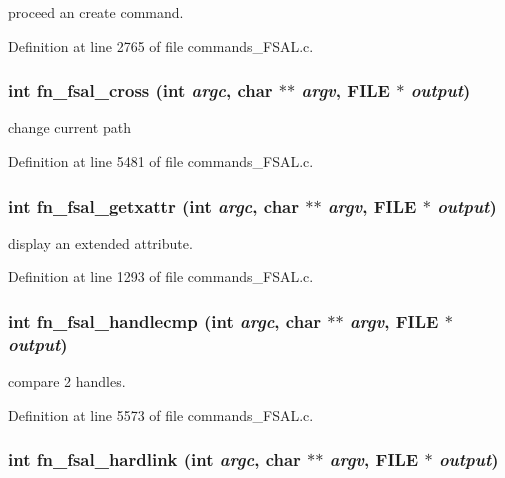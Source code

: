 proceed an create command. 

Definition at line 2765 of file commands\_\-FSAL.c.
\subsubsection[{fn\_\-fsal\_\-cross}]{\setlength{\rightskip}{0pt plus 5cm}int fn\_\-fsal\_\-cross (int {\em argc}, \/  char $\ast$$\ast$ {\em argv}, \/  FILE $\ast$ {\em output})}\label{commands__FSAL_8c_87895e361f769c6c2e3679db5be9ad81}


change current path 

Definition at line 5481 of file commands\_\-FSAL.c.
\subsubsection[{fn\_\-fsal\_\-getxattr}]{\setlength{\rightskip}{0pt plus 5cm}int fn\_\-fsal\_\-getxattr (int {\em argc}, \/  char $\ast$$\ast$ {\em argv}, \/  FILE $\ast$ {\em output})}\label{commands__FSAL_8c_1bc9d8bedd2c8b5adb767b449879ee18}


display an extended attribute. 

Definition at line 1293 of file commands\_\-FSAL.c.
\subsubsection[{fn\_\-fsal\_\-handlecmp}]{\setlength{\rightskip}{0pt plus 5cm}int fn\_\-fsal\_\-handlecmp (int {\em argc}, \/  char $\ast$$\ast$ {\em argv}, \/  FILE $\ast$ {\em output})}\label{commands__FSAL_8c_c09a903f6e71134eb73920e6bc873b63}


compare 2 handles. 

Definition at line 5573 of file commands\_\-FSAL.c.
\subsubsection[{fn\_\-fsal\_\-hardlink}]{\setlength{\rightskip}{0pt plus 5cm}int fn\_\-fsal\_\-hardlink (int {\em argc}, \/  char $\ast$$\ast$ {\em argv}, \/  FILE $\ast$ {\em output})}\label{commands__FSAL_8c_c9df7662f276abcf5428e6ff5f44593c}


